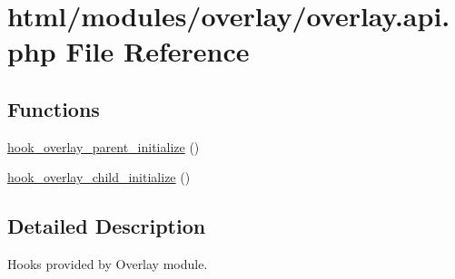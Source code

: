 \hypertarget{overlay_8api_8php}{
\section{html/modules/overlay/overlay.api.php File Reference}
\label{overlay_8api_8php}
}
\subsection*{Functions}
\begin{DoxyCompactItemize}
\item 
\hyperlink{group__hooks_ga4f7d60aad2768e7b8fac11839ea9b874}{hook\_\-overlay\_\-parent\_\-initialize} ()
\item 
\hyperlink{group__hooks_ga7bf562d101128af70a3eff0a0364342b}{hook\_\-overlay\_\-child\_\-initialize} ()
\end{DoxyCompactItemize}


\subsection{Detailed Description}
Hooks provided by Overlay module. 